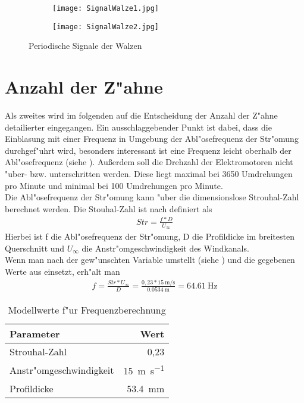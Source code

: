 \begin{figure}[h]
	\centering
	\begin{subfigure}[c]{0.5\textwidth}		
		\texttt{[image: SignalWalze1.jpg]}
	\end{subfigure}
	\begin{subfigure}[c]{0.5\textwidth}
		\texttt{[image: SignalWalze2.jpg]}
	\end{subfigure}
	\caption{Periodische Signale der Walzen}
	\label{fig:signal}
\end{figure}


\newpage
\section{Anzahl der Z"ahne}
Als zweites wird im folgenden auf die Entscheidung der Anzahl der Z"ahne detailierter eingegangen. Ein ausschlaggebender Punkt ist dabei, dass die Einblasung mit einer Frequenz in Umgebung der Abl"osefrequenz der Str"omung durchgef"uhrt wird, besonders interessant ist eine Frequenz leicht oberhalb der Abl"osefrequenz (siehe \cite{Oswald.2017}). Au\ss{}erdem soll die Drehzahl der Elektromotoren nicht "uber- bzw. unterschritten werden. Diese liegt maximal bei 3650 Umdrehungen pro Minute und minimal bei 100 Umdrehungen pro Minute.\\
Die Abl"osefrequenz der Str"omung kann "uber die dimensionslose Strouhal-Zahl berechnet werden. Die Stouhal-Zahl ist nach \cite{Leder.1992} definiert als
\begin{align}
	{Str}=\frac{f*D}{U_{\infty}}	\label{eq:Str}
\end{align}
Hierbei ist f die Abl"osefrequenz der Str"omung, D die Profildicke im breitesten Querschnitt und $U_{\infty}$ die Anstr"omgeschwindigkeit des Windkanals.\\
Wenn man  nach der gew"unschten Variable umstellt (siehe ) und die gegebenen Werte aus  einsetzt, erh"alt man
\begin{align}
	{f}=\frac{Str*U_{\infty}}{D}
		=\frac{0,23*\SI{15}{\meter\per\second}}{\SI{0,0534}{\meter}}
		=\SI{64,61}{\hertz}
		\label{eq:nachfumgestellt}
\end{align}
\begin{table}[h!]
	\centering
	\begin{tabular}{lr}
		\toprule
		Parameter & Wert\\
		\midrule
		Strouhal-Zahl & 0,23\\
		Anstr"omgeschwindigkeit & \SI{15}{\meter\per\second}\\
		Profildicke & \SI{53,4}{\milli\meter}\\
		\bottomrule
	\end{tabular}
	\caption{Modellwerte f"ur Frequenzberechnung}
	\label{tab:Modellwerte}
\end{table}\\
